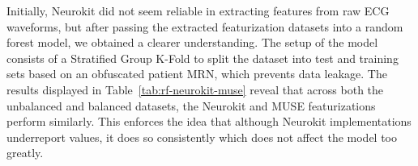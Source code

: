 \documentclass[sigconf,nonacm]{acmart}
\begin{document}
\begin{table}[H]
\centering
\caption{ECG waveform dataset details for RF experiments.}
\label{tab:rf-dataset}
\footnotesize
{}
\end{table}

\begin{table}[H]
\centering
\caption{MUSE feature implementations from metadata CSVs.}
\label{tab:muse-features}
\setlength{\arrayrulewidth}{0.4pt}
\renewcommand{\arraystretch}{1.25}
\end{table}

Initially, Neurokit did not seem reliable in extracting features from raw ECG waveforms, but after passing the extracted featurization datasets into a random forest model, we obtained a clearer understanding. The setup of the model consists of a Stratified Group K-Fold to split the dataset into test and training sets based on an obfuscated patient MRN, which prevents data leakage. The results displayed in Table~\ref{tab:rf-neurokit-muse} reveal that across both the unbalanced and balanced datasets, the Neurokit and MUSE featurizations perform similarly. This enforces the idea that although Neurokit implementations underreport values, it does so consistently which does not affect the model too greatly.
\end{document}

